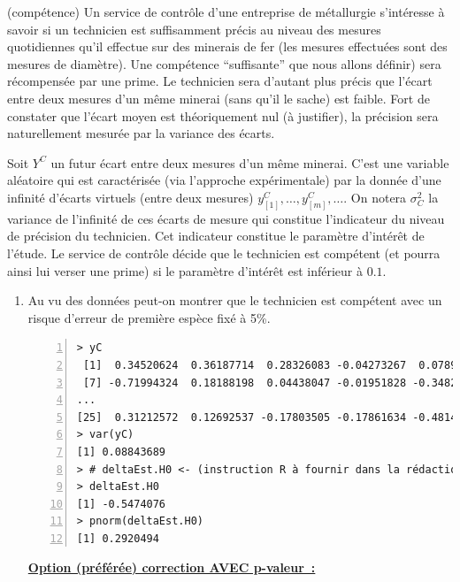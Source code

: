\documentclass[10pt]{report}
\begin{document}
\begin{exercice} (compétence)
Un service de contr{\^o}le d'une entreprise de m{\'e}tallurgie s'int{\'e}resse {\`a} savoir si un technicien est suffisamment pr{\'e}cis au niveau des mesures quotidiennes qu'il effectue sur des minerais de fer (les mesures effectu{\'e}es sont des mesures de diam{\`e}tre). Une comp{\'e}tence ``suffisante'' que nous allons d{\'e}finir) sera r{\'e}compens{\'e}e par une prime. Le technicien sera d'autant plus précis que l'écart entre deux mesures d'un même minerai (sans qu'il le sache) est faible. Fort de constater que l'écart moyen est théoriquement nul (à justifier), la précision sera naturellement mesurée  par la variance des écarts. 

Soit $Y^C$  un futur écart entre deux mesures d'un même minerai. C'est une variable aléatoire qui est caractérisée (via l'approche expérimentale) par la donnée d'une infinité d'écarts virtuels (entre deux mesures) $y^C_{[1]},\ldots,y^C_{[m]},\ldots$. On notera $\sigma^2_C$ la variance de l'infinité de ces écarts de mesure qui constitue l'indicateur du niveau de précision du technicien. Cet indicateur  constitue le param{\`e}tre d'int{\'e}r{\^e}t de l'{\'e}tude. Le service de contr{\^o}le d{\'e}cide que le technicien est comp{\'e}tent (et pourra ainsi lui verser une prime) si le param{\`e}tre d'int{\'e}r{\^e}t est inf{\'e}rieur {\`a} $0.1$. \\

\begin{enumerate}

\item Au vu des données peut-on montrer que le technicien est compétent avec un risque d'erreur de première espèce fixé à 5\%.

\IndicR
\begin{Verbatim}[frame=leftline,fontfamily=tt,fontshape=n,numbers=left]
> yC
 [1]  0.34520624  0.36187714  0.28326083 -0.04273267  0.07897429 -0.57583456
 [7] -0.71994324  0.18188198  0.04438047 -0.01951828 -0.34820050  0.26067820
...
[25]  0.31212572  0.12692537 -0.17803505 -0.17861634 -0.48143225 -0.07185419
> var(yC)
[1] 0.08843689
> # deltaEst.H0 <- (instruction R à fournir dans la rédaction)
> deltaEst.H0
[1] -0.5474076
> pnorm(deltaEst.H0)
[1] 0.2920494
\end{Verbatim}

 

\begin{Correction}
\textbf{\underline{Option (préférée) correction AVEC p-valeur~:}}\\


\end{Correction}
\end{enumerate}
\end{exercice}
\end{document}
